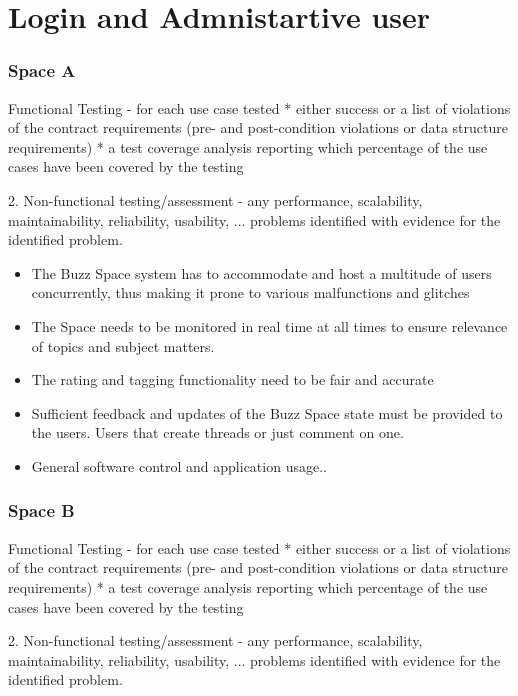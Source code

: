 \documentclass[a4paper,12pt,titlepage]{article}
\begin{document}
\section{Login and Admnistartive user}
	\subsubsection*{Space A}
		Functional Testing
		- for each use case tested
		* either success or a list of violations of the contract requirements (pre- and post-condition violations or data structure requirements)
		* a test coverage analysis reporting which percentage of the use cases have been covered by the testing
		
		2. Non-functional testing/assessment
		- any performance, scalability, maintainability, reliability, usability, ... problems identified with evidence for the identified problem.
	
				
					\begin{itemize}
							\item The Buzz Space system has to accommodate and host a multitude of users concurrently, thus making it prone to various malfunctions and glitches
							
							\item The Space needs to be monitored in real time at all times to ensure relevance of topics and subject matters.
							\item The rating and tagging functionality need to be fair and accurate
							
							\item Sufficient feedback and updates of the Buzz Space state must be provided to the users. Users that create threads or just comment on one.
							
							\item General software control and application usage..
						 \end{itemize}
	
	
	
	\subsubsection*{Space B}
		Functional Testing
		- for each use case tested
		* either success or a list of violations of the contract requirements (pre- and post-condition violations or data structure requirements)
		* a test coverage analysis reporting which percentage of the use cases have been covered by the testing
		
		2. Non-functional testing/assessment
		- any performance, scalability, maintainability, reliability, usability, ... problems identified with evidence for the identified problem.
	
\end{document}
